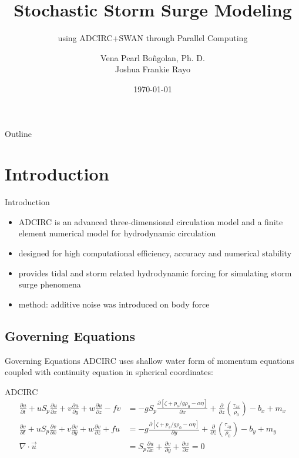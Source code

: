 \documentclass[10pt]{beamer}
\title[Stochastic Storm Surge Modeling \ldots]{Stochastic Storm Surge Modeling}
\subtitle{using ADCIRC+SWAN through Parallel Computing}
\author[VP Bo\~{n}golan, JF Rayo]{Vena Pearl Bo\~{n}golan, Ph. D.\\ Joshua Frankie Rayo}
\institute{
\sclaffiliation\\
\tref{vabongolan@dcs.upd.edu.ph, jbrayo@up.edu.ph}
   }
\date{\today}
\begin{document}
{\SCLtitlepagebg
\begin{frame}
  \maketitle
  \insertSCLDCSUPlogos
\end{frame}}

\begin{frame}[noframenumbering]{Outline}
\tableofcontents
\end{frame}


\section{Introduction}
\begin{frame}{Introduction}{}
  \begin{itemize}
    \item<1-> ADCIRC is an advanced three-dimensional circulation model and a finite element numerical model for hydrodynamic circulation
    \item<1-> designed for high computational efficiency, accuracy and numerical stability
    \item<1-> provides tidal and storm related hydrodynamic forcing for simulating storm surge phenomena
    \item<2-> method: additive noise was introduced on body force
  \end{itemize}
\end{frame}

\subsection{Governing Equations}
\begin{frame}{Governing Equations}{}
  ADCIRC uses shallow water form of momentum equations coupled with continuity equation in spherical coordinates:
  \begin{block}{ADCIRC}
  	\footnotesize
  	\begin{align*}
  	\frac{\partial u}{\partial t} + u S_p \frac{\partial u}{\partial x} + v \frac{\partial u}{\partial y} + w \frac{\partial u}{\partial z} - fv &= -g S_p \frac{\partial \left[\zeta + p_s/g \rho_0 - \alpha \eta\right]}{\partial x} + \frac{\partial}{\partial z} \left(\frac{\tau_{zx}}{\rho_0}\right) - b_x + m_x \\
  	\frac{\partial v}{\partial t} + u S_p \frac{\partial v}{\partial x} + v \frac{\partial v}{\partial y} + w \frac{\partial v}{\partial z} + fu &= -g \frac{\partial \left[\zeta + p_s/g \rho_0 - \alpha \eta\right]}{\partial y} + \frac{\partial}{\partial z} \left(\frac{\tau_{zy}}{\rho_0}\right) - b_y + m_y \\
  	\nabla \cdot \vec{u} &= S_p \frac{\partial u}{\partial x} + \frac{\partial v}{\partial y} + \frac{\partial w}{\partial z} = 0
  	\end{align*}
  	\normalsize
  \end{block}
\end{frame}
\end{document}
